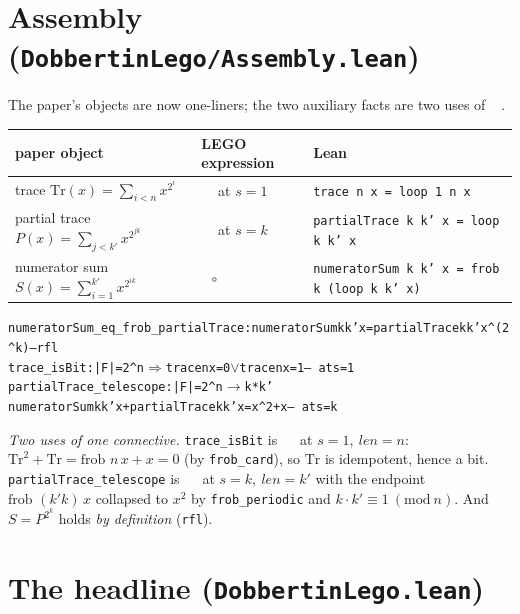 \documentclass[11pt]{article}
\newenvironment{lean}{\begin{leanbox}\begin{alltt}\small}{\end{alltt}\end{leanbox}}
\newcommand{\bF}{{\colorbox{faceF}{\textcolor{white}{\scriptsize\bfseries F}}}}
\newcommand{\bL}{{\colorbox{faceL}{\textcolor{white}{\scriptsize\bfseries L}}}}
\newcommand{\bT}{{\colorbox{conn}{\textcolor{white}{\scriptsize\bfseries T}}}}
\newcommand{\ck}{\textcolor{grn}{\checkmark}}
\newcommand{\lc}[1]{\texttt{\small #1}}
\begin{document}
\section{Assembly (\texttt{DobbertinLego/Assembly.lean})}

The paper's objects are now one-liners; the two auxiliary facts are two uses of
\bT.
\begin{center}\small
\renewcommand{\arraystretch}{1.3}
\begin{tabular}{@{}l l l@{}}
\textbf{paper object} & \textbf{LEGO expression} & \textbf{Lean}\\ \hline
trace $\mathrm{Tr}(x)=\sum_{i<n}x^{2^i}$ & \bL\ at $s{=}1$ & \lc{trace n x = loop 1 n x}\\
partial trace $P(x)=\sum_{j<k'}x^{2^{jk}}$ & \bL\ at $s{=}k$ & \lc{partialTrace k k' x = loop k k' x}\\
numerator sum $S(x)=\sum_{i=1}^{k'}x^{2^{ik}}$ & \bF$\circ$\bL & \lc{numeratorSum k k' x = frob k (loop k k' x)}\\
\end{tabular}
\end{center}
\begin{lean}
numeratorSum_eq_frob_partialTrace : numeratorSum k k' x = partialTrace k k' x ^(2^k)  \ck  -- rfl
trace_isBit            : |F|=2^n \(\Rightarrow\) trace n x = 0 \(\vee\) trace n x = 1        \ck  -- \bT at s=1
partialTrace_telescope : |F|=2^n \(\to\) k*k'%
                           numeratorSum k k' x + partialTrace k k' x = x^2 + x   \ck  -- \bT at s=k
\end{lean}
\emph{Two uses of one connective.} \lc{trace\_isBit} is \bT\ at $s{=}1,\ len{=}n$:
$\mathrm{Tr}^2+\mathrm{Tr}=\text{frob }n\,x+x=0$ (by \lc{frob\_card}), so
$\mathrm{Tr}$ is idempotent, hence a bit. \lc{partialTrace\_telescope} is \bT\ at
$s{=}k,\ len{=}k'$ with the endpoint $\text{frob }(k'k)\,x$ collapsed to $x^2$ by
\lc{frob\_periodic} and $k\cdot k'\equiv1\ (\mathrm{mod}\ n)$. And
$S=P^{2^k}$ holds \emph{by definition} (\lc{rfl}).

\section{The headline (\texttt{DobbertinLego.lean})}
\end{document}

